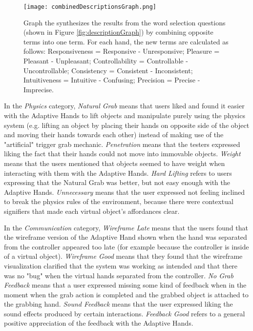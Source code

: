 \begin{figure}[H]
\centering
\texttt{[image: combinedDescriptionsGraph.png]}
\caption{Graph the synthesizes the results from the word selection questions (shown in Figure \ref{fig:descriptionGraph}) by combining opposite terms into one term. For each hand, the new terms are calculated as follows: Responsiveness = Responsive - Unresponsive; Pleasure = Pleasant - Unpleasant; Controllability = Controllable - Uncontrollable; Consistency = Consistent - Inconsistent; Intuitiveness = Intuitive - Confusing; Precision = Precise - Imprecise.}
\label{fig:combinedDescriptionsGraph}
\end{figure}

In the \textit{Physics} category, \textit{Natural Grab} means that users liked and found it easier with the Adaptive Hands to lift objects and manipulate purely using the physics system (e.g. lifting an object by placing their hands on opposite side of the object and moving their hands towards each other) instead of making use of the "artificial" trigger grab mechanic. \textit{Penetration} means that the testers expressed liking the fact that their hands could not move into immovable objects. \textit{Weight} means that the users mentioned that objects seemed to have weight when interacting with them with the Adaptive Hands. \textit{Hard Lifting} refers to users expressing that the Natural Grab was better, but not easy enough with the Adaptive Hands. \textit{Unnecessary} means that the user expressed not feeling inclined to break the physics rules of the environment, because there were contextual signifiers \parencite{Norman2010} that made each virtual object's affordances clear.

In the \textit{Communication} category, \textit{Wireframe Late} means that the users found that the wireframe version of the Adaptive Hand shown when the hand was separated from the controller appeared too late (for example because the controller is inside of a virtual object). \textit{Wireframe Good} means that they found that the wireframe visualization clarified that the system was working as intended and that there was no "bug" when the virtual hands separated from the controller. \textit{No Grab Feedback} means that a user expressed missing some kind of feedback when in the moment when the grab action is completed and the grabbed object is attached to the grabbing hand. \textit{Sound Feedback} means that the user expressed liking the sound effects produced by certain interactions. \textit{Feedback Good} refers to a general positive appreciation of the feedback with the Adaptive Hands.

